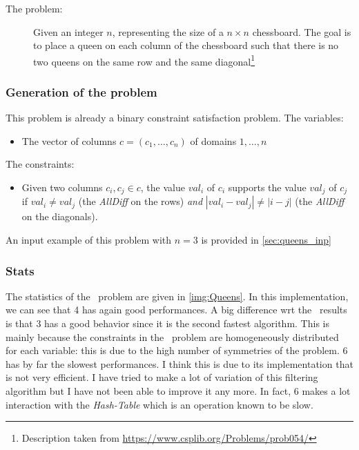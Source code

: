 \documentclass{rapport}
\begin{document}
\begin{description}
  \item[The problem:] Given an integer $n$, representing the size of a $n \times n$ chessboard. The goal is to place a queen on each column of the chessboard such that there is no two queens on the same row and the same diagonal\footnote{Description taken from \url{https://www.csplib.org/Problems/prob054/}}
\end{description}

\subsubsection{Generation of the problem}

This problem is already a binary constraint satisfaction problem.
The variables:
\begin{itemize}
  \item The vector of columns $c = (c_1, \dots, c_n)$ of domains $1, \dots, n$
\end{itemize}

The constraints:
\begin{itemize}
  \item Given two columns $c_i, c_j \in c$, the value $val_i$ of $c_i$ supports the value $val_j$ of $c_j$ if $val_i \neq val_j$ (the \textit{AllDiff} on the rows) \textit{and} $|val_i - val_j| \neq |i - j|$ (the \textit{AllDiff} on the diagonals).
\end{itemize}

An input example of this problem with $n = 3$ is provided in \cref{sec:queens_inp}

\subsubsection{Stats}

The statistics of the \queens\ problem are given in \cref{img:Queens}. In this implementation, we can see that \ac{4} has again good performances. A big difference wrt the \allint\ results is that \ac{3} has a good behavior since it is the second fastest algorithm. This is mainly because the constraints in the \queens\ problem are homogeneously distributed for each variable: this is due to the high number of symmetries of the problem. \ac{6} has by far the slowest performances. I think this is due to its implementation that is not very efficient. I have tried to make a lot of variation of this filtering algorithm but I have not been able to improve it any more. In fact, \ac{6} makes a lot interaction with the \textit{Hash-Table} which is an operation known to be slow.
\end{document}
